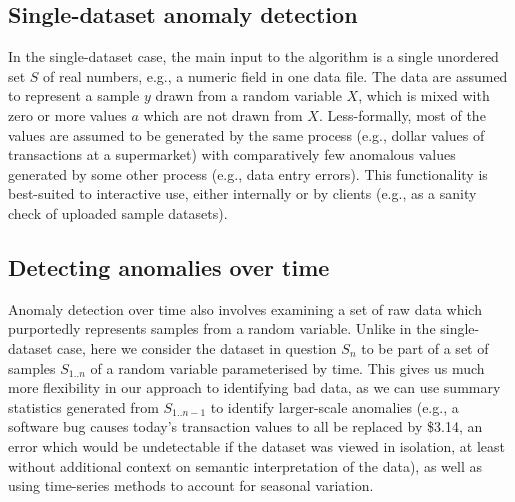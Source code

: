 \documentclass[a4paper]{article}
\begin{document}
\subsection{Single-dataset anomaly detection}\label{anomaly-detection-single-dataset}

In the single-dataset case, the main input to the algorithm is a
single unordered set \( S \) of real numbers, e.g., a numeric field in
one data file. The data are assumed to represent a sample \( y \)
drawn from a random variable \( X \), which is mixed with zero or
more values \( a \) which are not drawn from \( X \). Less-formally, most of the
values are assumed to be generated by the same process (e.g., dollar
values of transactions at a supermarket) with comparatively few
anomalous values generated by some other process (e.g., data entry
errors). This functionality is best-suited to interactive use,
either internally or by clients (e.g., as a sanity check of uploaded
sample datasets).

\subsection{Detecting anomalies over time}\label{anomaly-detection-over-time}

Anomaly detection over time also involves examining a set of raw data
which purportedly represents samples from a random variable. Unlike in
the single-dataset case, here we consider the dataset in question \(
S_n \) to be part of a set of samples \( S_{1..n} \) of a random
variable parameterised by time. This gives us much more flexibility in
our approach to identifying bad data, as we can use summary statistics
generated from \( S_{1..n-1} \) to identify larger-scale anomalies
(e.g., a software bug causes today's transaction values to all be
replaced by \$3.14, an error which would be undetectable if the
dataset was viewed in isolation, at least without additional context
on semantic interpretation of the data), as well as using time-series
methods to account for seasonal variation.



\end{document}
